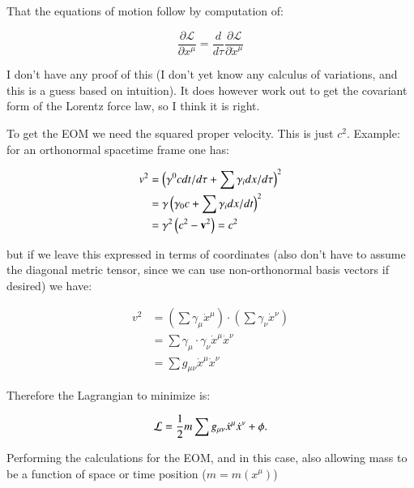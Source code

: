 \documentclass{article}      %
\newcommand{\LL}[0]{\mathcal{L}}
\newcommand{\PD}[2]{\frac{\partial {#2}}{\partial {#1}}}
\newcommand{\xdot}[0]{\dot{x}}
\begin{document}
That the equations of motion follow by computation of:

\begin{equation}
\PD{x^{\mu}}{\LL} = \frac{d}{d\tau} \PD{\xdot^{\mu}}{\LL}
\end{equation}

I don't have any proof of this (I don't yet know any calculus of variations, and this is a guess based on intuition).  It does however work out to get the covariant form of the Lorentz force law, so I think it is right.

To get the EOM we need the squared proper velocity.  This is just $c^2$.  Example: for an orthonormal spacetime frame one has:

\begin{align*}
v^2 &= 
\left(\gamma^0 c dt/d\tau + \sum \gamma_i dx/d\tau\right)^2  \\
&= \gamma \left(\gamma_0 c + \sum \gamma_i dx/dt\right)^2 \\
&= \gamma^2 \left(c^2 - \mathbf{v}^2\right) = c^2
\end{align*}

but if we leave this expressed in terms of coordinates (also don't have to assume the diagonal metric tensor, since we can use non-orthonormal basis vectors if desired) we have:

\begin{align*}
v^2 
&= \left(\sum \gamma_{\mu} \xdot^{\mu}\right) \cdot \left(\sum \gamma_{\nu} \xdot^{\nu}\right) \\
&= \sum \gamma_{\mu} \cdot \gamma_{\nu} \xdot^{\mu} \xdot^{\nu} \\
&= \sum g_{\mu\nu} \xdot^{\mu} \xdot^{\nu}
\end{align*}

Therefore the Lagrangian to minimize is:

\begin{equation}
\LL = \inv{2} m \sum g_{\mu\nu} \xdot^{\mu} \xdot^{\nu} + \phi.
\end{equation}

Performing the calculations for the EOM, and in this case, also allowing mass to be a function of space or time position ($m = m(x^{\mu})$)
\end{document}
